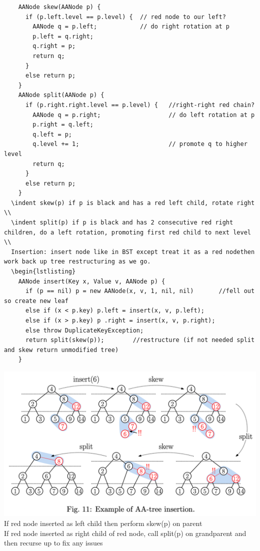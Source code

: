\documentclass{article}
\begin{document}
  \begin{lstlisting}
    AANode skew(AANode p) {   
      if (p.left.level == p.level) {  // red node to our left?
        AANode q = p.left;            // do right rotation at p
        p.left = q.right;
        q.right = p;
        return q;
      }
      else return p;
    }
    AANode split(AANode p) {
      if (p.right.right.level == p.level) {   //right-right red chain?
        AANode q = p.right;                   // do left rotation at p
        p.right = q.left;
        q.left = p;
        q.level += 1;                         // promote q to higher level
        return q;
      }
      else return p;
    }
  \indent skew(p) if p is black and has a red left child, rotate right \\
  \indent split(p) if p is black and has 2 consecutive red right children, do a left rotation, promoting first red child to next level \\
  Insertion: insert node like in BST except treat it as a red nodethen work back up tree restructuring as we go. 
  \begin{lstlisting}
    AANode insert(Key x, Value v, AANode p) {
      if (p == nil) p = new AANode(x, v, 1, nil, nil)       //fell out so create new leaf
      else if (x < p.key) p.left = insert(x, v, p.left);
      else if (x > p.key) p .right = insert(x, v, p.right);
      else throw DuplicateKeyException;
      return split(skew(p));        //restructure (if not needed split and skew return unmodified tree)
    }
  \end{lstlisting}
  \includegraphics[width=\textwidth]{InsertionAATree}
  \indent If red node inserted as left child then perform skew(p) on parent\\
  \indent If red node inserted as right child of red node, call split(p) on grandparent and then recurse up to fix any issues \\
\end{document}
